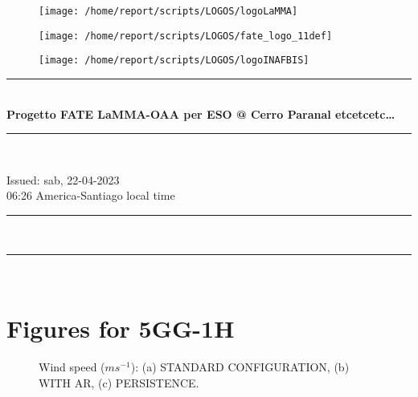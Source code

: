 \documentclass[11pt,english]{article}
\newcommand{\HRule}{\rule{\linewidth}{0.5mm}}
\begin{document}
\begin{figure}
\begin{center}
\hspace{1.5cm}
\parbox{5.5cm}{\texttt{[image: /home/report/scripts/LOGOS/logoLaMMA]}}
\hspace{.3cm}
\parbox{5.5cm}{\texttt{[image: /home/report/scripts/LOGOS/fate\_logo\_11def]}}
\hspace{.3cm}
\parbox{5.5cm}{\texttt{[image: /home/report/scripts/LOGOS/logoINAFBIS]}}
\hspace{.1cm}
\vspace{1.2cm}
\end{center}
\end{figure}

\begin{center}
\HRule \\[0.4cm]
\Huge{\textbf{Progetto FATE LaMMA-OAA per ESO @ Cerro Paranal etcetcetc\ldots}}
\HRule \\[0.4cm]
\end{center}

\begin{center}
\vspace{2cm}\Huge{Issued: sab, 22-04-2023\\ 06:26 America-Santiago local time}
\end{center}

\begin{center}
\HRule \\[0.1cm]
\tableofcontents
\HRule \\[0.1cm]
\end{center}
\newpage
\clearpage
\section{Figures for 5GG-1H}

\begin{figure}
\centering
{}
\caption{Wind speed ($m s^{-1}$): (a) STANDARD CONFIGURATION, (b) WITH AR, (c) PERSISTENCE.}
\label{fig:ws}
\end{figure}
\end{document}
